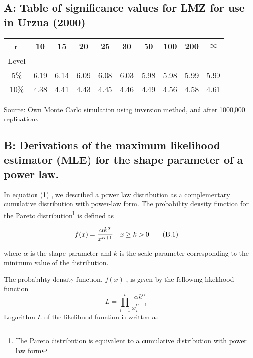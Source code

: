 \documentclass[10pt,a4paper]{article}
\begin{document}
\subsection*{A: Table of significance values for LMZ for use in Urzua (2000)}
\begin{table}[h]
\begin{center}
\begin{tabular}{cccccccccc} \hline
n           & 10 & 15 & 20 & 25 & 30 & 50 & 100 & 200 & $\infty$  \\ \hline
Level     &     &     &       &     &      &      &       &       &            \\  
 5\%       & 6.19 & 6.14 & 6.09 &6.08& 6.03& 5.98 & 5.98 & 5.99 & 5.99 \\  
 10\%     & 4.38 & 4.41 &4.43 & 4.45 & 4.46 & 4.49 & 4.56 & 4.58 & 4.61 \\ \hline

\end{tabular}
\end{center} 
\end{table}
  
Source: Own Monte Carlo simulation using inversion method, and after 1000,000 replications

\subsection*{B: Derivations of the maximum likelihood estimator (MLE) for the shape parameter of a power law.}

In equation (1) , we described a power law distribution as a complementary cumulative distribution with power-law form. The probability density function for the Pareto distribution\footnote{The Pareto distribution is equivalent to a cumulative distribution with power law form}  is defined as 

\begin{equation}
\numberwithin{equation}{section}
 f(x)=\frac{\alpha k^{\alpha}}{x^{\alpha+1}}    \quad  x \ge k > 0  \tag{B.1}
\end{equation}

where $\alpha$ is the shape parameter and $k$  is the scale parameter corresponding to the minimum value of the distribution.
  
The probability density function, $f(x)$ , is given by the following likelihood function 
\begin{equation}
L=\prod^{n}_{i=1}\frac{\alpha k^{\alpha}}{x^{\alpha+1}_{i} } \tag{B.2}
\end{equation}
Logarithm  $L$ of the likelihood function is written as 
\end{document}
